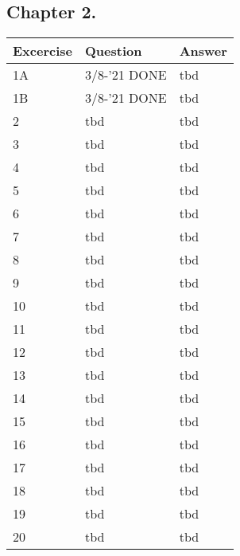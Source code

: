 \subsection*{Chapter 2.}
\begin{tabular}{|l|l|l|}
    \hline
    \rowcolor[HTML]{EFEFEF}
    {\color[HTML]{000000} Excercise } & {\color[HTML]{000000} Question } & {\color[HTML]{000000} Answer } \\ \hline
    1A & 3/8-'21 DONE & tbd \\ \hline
    1B & 3/8-'21 DONE & tbd \\ \hline
    2 & tbd & tbd \\ \hline
    3 & tbd & tbd \\ \hline
    4 & tbd & tbd \\ \hline
    5 & tbd & tbd \\ \hline
    6 & tbd & tbd \\ \hline
    7 & tbd & tbd \\ \hline
    8 & tbd & tbd \\ \hline
    9 & tbd & tbd \\ \hline
    10 & tbd & tbd \\ \hline
    11 & tbd & tbd \\ \hline
    12 & tbd & tbd \\ \hline
    13 & tbd & tbd \\ \hline
    14 & tbd & tbd \\ \hline
    15 & tbd & tbd \\ \hline
    16 & tbd & tbd \\ \hline
    17 & tbd & tbd \\ \hline
    18 & tbd & tbd \\ \hline
    19 & tbd & tbd \\ \hline
    20 & tbd & tbd \\ \hline
\end{tabular}
